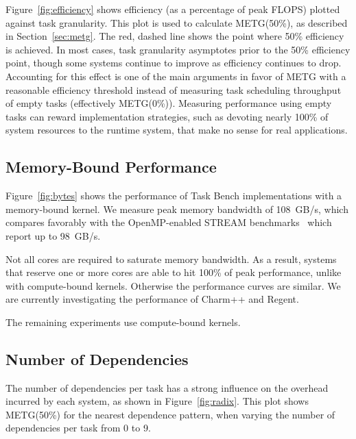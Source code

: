 Figure~\ref{fig:efficiency} shows efficiency (as a percentage of
peak FLOPS) plotted against task granularity. This plot is
used to calculate METG(50\%), as described in Section~\ref{sec:metg}. The
red, dashed line shows the point where 50\% efficiency is achieved.
In most cases, task granularity asymptotes prior to the 50\% efficiency point,
though some systems continue to improve as efficiency continues
to drop. Accounting for this effect is one of the main arguments in
favor of METG with a reasonable efficiency threshold instead of
measuring task scheduling throughput of empty tasks
(effectively METG(0\%)). Measuring performance using empty tasks can
reward implementation strategies, such as devoting nearly 100\% of
system resources to the runtime system, that make no sense for real
applications.

\subsection{Memory-Bound Performance}

Figure~\ref{fig:bytes} shows the performance of Task Bench
implementations with a memory-bound kernel. We measure peak memory
bandwidth of 108~GB/s, which compares favorably with the
OpenMP-enabled STREAM benchmarks~\cite{STREAM} which report up to 98~GB/s.

Not all cores are required to saturate memory bandwidth. As a result,
systems that reserve one or more cores are able to hit 100\% of peak
performance, unlike with compute-bound kernels. Otherwise the
performance curves are similar. We are currently investigating the
performance of Charm++ and Regent.


The remaining experiments use compute-bound kernels.


\subsection{Number of Dependencies}
\label{subsec:number-of-dependencies}




The number of dependencies per task has a strong influence on the
overhead incurred by each system, as shown in
Figure~\ref{fig:radix}. This plot shows METG(50\%) for the nearest
dependence pattern, when varying the number of dependencies per task
from 0 to 9.

